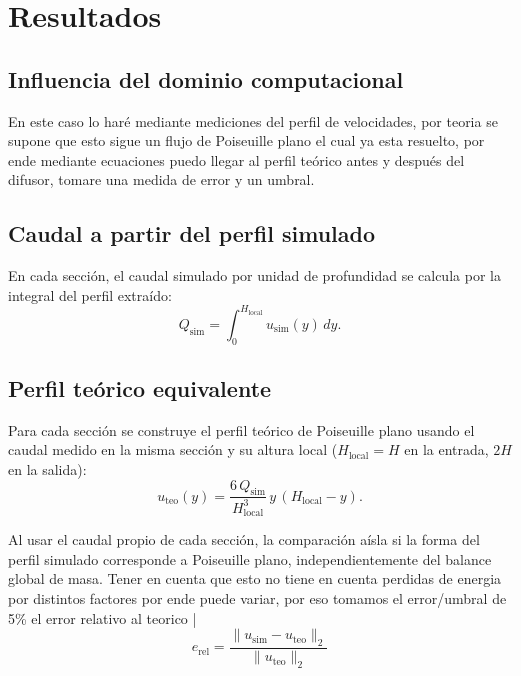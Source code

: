 \section{Resultados}
\label{sec:resultados}

\subsection{Influencia del dominio computacional}
En este caso lo haré mediante mediciones del perfil de velocidades, por teoria se supone que esto sigue un flujo de Poiseuille plano el cual ya esta resuelto, por ende mediante ecuaciones puedo llegar al perfil teórico antes y después del difusor, tomare una medida de error y un umbral.

\subsection{Caudal a partir del perfil simulado}
En cada sección, el caudal simulado por unidad de profundidad se calcula por
la integral del perfil extraído:
\[
Q_{\text{sim}} = \int_0^{H_{\text{local}}} u_{\text{sim}}(y)\,dy .
\]

\subsection{Perfil teórico equivalente}
Para cada sección se construye el perfil teórico de Poiseuille plano usando
el caudal medido en la misma sección y su altura local
($H_{\text{local}}=H$ en la entrada, $2H$ en la salida):
\[
u_{\text{teo}}(y) = \frac{6\,Q_{\text{sim}}}{H_{\text{local}}^3}\, y\,(H_{\text{local}}-y).
\]

Al usar el caudal propio de cada sección, la comparación aísla si la
forma del perfil simulado corresponde a Poiseuille plano,
independientemente del balance global de masa.
Tener en cuenta que esto no tiene en cuenta perdidas de energia por distintos factores por ende puede variar, por eso tomamos el error/umbral de 5\% 
el error relativo al teorico |
\[
e_{\text{rel}} = \frac{\lVert u_{\text{sim}} - u_{\text{teo}} \rVert_2}
                       {\lVert u_{\text{teo}} \rVert_2}\]


\newpage
